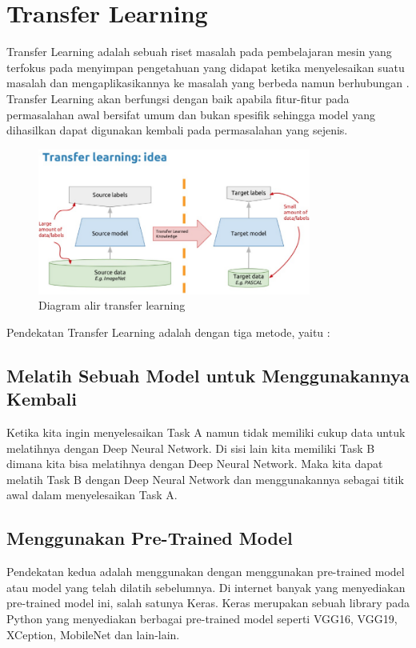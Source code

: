 \section{Transfer Learning}
\par Transfer Learning adalah sebuah riset masalah pada pembelajaran mesin yang terfokus pada menyimpan pengetahuan yang didapat ketika menyelesaikan suatu masalah dan mengaplikasikannya ke masalah yang berbeda namun berhubungan \cite{transfer_def}. Transfer Learning akan berfungsi dengan baik apabila fitur-fitur pada permasalahan awal bersifat umum dan bukan spesifik sehingga model yang dihasilkan dapat digunakan kembali pada permasalahan yang sejenis.
\begin{figure}[!ht]
	\centering\includegraphics[width=0.8\textwidth]{bab2/figures/transfer-works.png}
	\caption{Diagram alir transfer learning\cite{transfer_pic}}
	\label{fig:transfer-works}
\end{figure}
\par Pendekatan Transfer Learning adalah dengan tiga metode, yaitu : 

\subsection{Melatih Sebuah Model untuk Menggunakannya Kembali}
\par Ketika kita ingin menyelesaikan Task A namun tidak memiliki cukup data untuk melatihnya dengan Deep Neural Network. Di sisi lain kita memiliki Task B dimana kita bisa melatihnya dengan Deep Neural Network. Maka kita dapat melatih Task B dengan Deep Neural Network dan menggunakannya sebagai titik awal dalam menyelesaikan Task A.

\subsection{Menggunakan Pre-Trained Model}
\par Pendekatan kedua adalah menggunakan dengan menggunakan pre-trained model atau model yang telah dilatih sebelumnya. Di internet banyak yang menyediakan pre-trained model ini, salah satunya Keras. Keras merupakan sebuah library pada Python yang menyediakan berbagai pre-trained model seperti VGG16, VGG19, XCeption, MobileNet dan lain-lain. 


